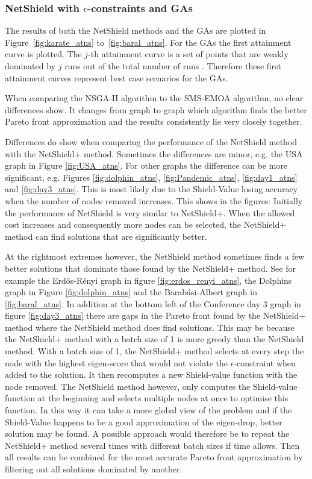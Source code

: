 \documentclass[11pt]{article}
\theoremstyle{definition}
\begin{document}
\subsubsection{NetShield with $\epsilon$-constraints and GAs}

The results of both the NetShield methods and the GAs are plotted in Figure~\ref{fig:karate_atns} to~\ref{fig:baral_atns}. For the GAs the first attainment curve is plotted. The $j$-th attainment curve is a set of points that are weakly dominated by $j$ runs out of the total number of runs \cite{Fonseca96a} \cite{Fonseca01}. Therefore these first attainment curves represent best case scenarios for the GAs.

When comparing the NSGA-II algorithm to the SMS-EMOA algorithm, no clear differences show. It changes from graph to graph which algorithm finds the better Pareto front approximation and the results consistently lie very closely together.

Differences do show when comparing the performance of the NetShield method with the NetShield+ method. Sometimes the differences are minor, e.g. the USA graph in Figure \ref{fig:USA_atns}. For other graphs the difference can be more significant, e.g. Figures \ref{fig:dolphin_atns}, \ref{fig:Pandemic_atns}, \ref{fig:day1_atns} and \ref{fig:day3_atns}. This is most likely due to the Shield-Value losing accuracy when the number of nodes removed increases. This shows in the figures: Initially the performance of NetShield is very similar to NetShield+. When the allowed cost increases and consequently more nodes can be selected, the NetShield+ method can find solutions that are significantly better. 

At the rightmost extremes however, the NetShield method sometimes finds a few better solutions that dominate those found by the NetShield+ method. See for example the  Erd\H{o}s-R\'enyi graph in figure \ref{fig:erdos_renyi_atns}, the Dolphins graph in Figure \ref{fig:dolphin_atns} and the Barab\'asi-Albert graph in \ref{fig:baral_atns}. In addition at the bottom left of the Conference day 3 graph in figure \ref{fig:day3_atns} there are gaps in the Pareto front found by the NetShield+ method where the NetShield method does find solutions. This may be because the NetShield+ method with a batch size of 1 is more greedy than the NetShield method. With a batch size of 1, the NetShield+ method selects at every step the node with the highest eigen-score that would not violate the $\epsilon$-constraint when added to the solution. It then recomputes a new Shield-value function with the node removed. The NetShield method however, only computes the Shield-value function at the beginning and selects multiple nodes at once to optimise this function. In this way it can take a more global view of the problem and if the Shield-Value happens to be a good approximation of the eigen-drop, better solution may be found. A possible approach would therefore be to repeat the NetShield+ method several times with different batch sizes if time allows. Then all results can be combined for the most accurate Pareto front approximation by filtering out all solutions dominated by another.
\end{document}

